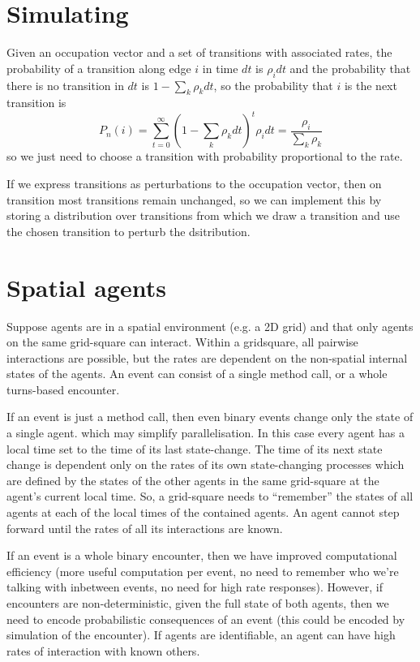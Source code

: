 \documentclass[a4paper]{article}
\begin{document}
\section{Simulating}

Given an occupation vector and a set of transitions with associated rates, the probability of a transition along edge $i$ in time $dt$ is $\rho_i dt$ and the probability that there is no transition in $dt$ is $1-\sum_k \rho_k dt$, so the probability that $i$ is the next transition is
\[
P_n(i) = \sum_{t=0}^\infty (1-\sum_k \rho_k dt)^t \rho_i dt = \frac{\rho_i}{\sum_k \rho_k}
\]
so we just need to choose a transition with probability proportional to the rate.

If we express transitions as perturbations to the occupation vector, then on transition most transitions remain unchanged, so we can implement this by storing a distribution over transitions from which we draw a transition and use the chosen transition to perturb the dsitribution.

\section{Spatial agents}

Suppose agents are in a spatial environment (e.g. a 2D grid) and that only agents on the same grid-square can interact. Within a gridsquare, all pairwise interactions are possible, but the rates are dependent on the non-spatial internal states of the agents. An event can consist of a single method call, or a whole turns-based encounter.

If an event is just a method call, then even binary events change only the state of a single agent. which may simplify parallelisation. In this case every agent has a local time set to the time of its last state-change. The time of its next state change is dependent only on the rates of its own state-changing processes which are defined by the states of the other agents in the same grid-square at the agent's current local time. So, a grid-square needs to ``remember'' the states of all agents at each of the local times of the contained agents. An agent cannot step forward until the rates of all its interactions are known.

If an event is a whole binary encounter, then we have improved computational efficiency (more useful computation per event, no need to remember who we're talking with inbetween events, no need for high rate responses). However, if encounters are non-deterministic, given the full state of both agents, then we need to encode probabilistic consequences of an event (this could be encoded by simulation of the encounter). If agents are identifiable, an agent can have high rates of interaction with known others.
\end{document}
